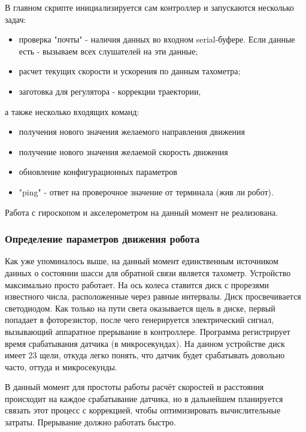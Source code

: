 \documentclass[14pt,a4paper,russian]{scrartcl}
\begin{document}
В главном скрипте инициализируется сам контроллер и запускаются несколько задач:
\begin{itemize}
    \item проверка "почты" - наличия данных во входном serial-буфере. Если данные
    есть - вызываем всех слушателей на эти данные;
    \item расчет текущих скорости и ускорения по данным тахометра;
    \item заготовка для регулятора - коррекции траектории,
\end{itemize}
а также несколько входящих команд:
\begin{itemize}
    \item получения нового значения желаемого направления движения
    \item получение нового значения желаемой скорость движения
    \item обновление конфигурационных параметров
    \item "ping" - ответ на проверочное значение от терминала (жив ли робот).
\end{itemize}

Работа с гироскопом и акселерометром на данный момент не реализована.

\subsubsection{Определение параметров движения робота}
Как уже упоминалось выше, на данный момент единственным источником данных
о состоянии шасси для обратной связи является тахометр. Устройство максимально просто работает.
На ось колеса ставится диск с прорезями известного числа, расположенные через
равные интервалы. Диск просвечивается светодиодом. Как только на пути света оказывается
щель в диске, первый попадает в фоторезистор, после чего генерируется электрический
сигнал, вызывающий аппаратное прерывание в контроллере. Программа регистрирует
время срабатывания датчика (в микросекундах). На данном устройстве диск имеет 23 щели,
откуда легко понять, что датчик будет срабатывать довольно часто, оттуда и микросекунды.

В данный момент для простоты работы расчёт скоростей и расстояния происходит на каждое
срабатывание датчика, но в дальнейшем планируется связать этот процесс с 
коррекцией, чтобы оптимизировать вычислительные затраты. Прерывание должно работать быстро.
\end{document}

